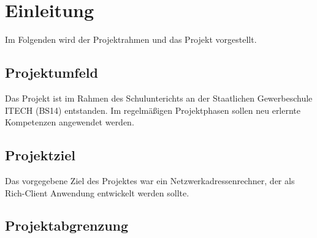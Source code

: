 \section{Einleitung}
Im Folgenden wird der Projektrahmen und das Projekt vorgestellt.

\subsection{Projektumfeld}
Das Projekt ist im Rahmen des Schulunterichts an der Staatlichen Gewerbeschule ITECH (BS14)
entstanden. Im regelmäßigen Projektphasen sollen neu erlernte Kompetenzen angewendet werden.

\subsection{Projektziel}
Das vorgegebene Ziel des Projektes war ein Netzwerkadressenrechner, der als Rich-Client Anwendung
entwickelt werden sollte.

\subsection{Projektabgrenzung}